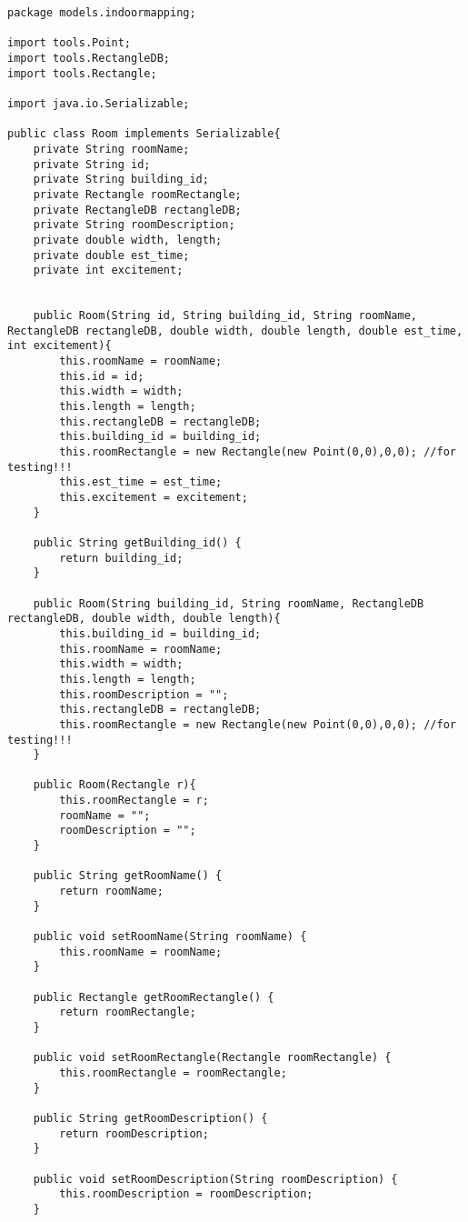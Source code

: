 \documentclass{article}
\begin{document}
\begin{lstlisting}package models.indoormapping;

import tools.Point;
import tools.RectangleDB;
import tools.Rectangle;

import java.io.Serializable;

public class Room implements Serializable{
    private String roomName;
    private String id;
    private String building_id;
    private Rectangle roomRectangle;
    private RectangleDB rectangleDB;
    private String roomDescription;
    private double width, length;
    private double est_time;
    private int excitement;


    public Room(String id, String building_id, String roomName, RectangleDB rectangleDB, double width, double length, double est_time, int excitement){
        this.roomName = roomName;
        this.id = id;
        this.width = width;
        this.length = length;
        this.rectangleDB = rectangleDB;
        this.building_id = building_id;
        this.roomRectangle = new Rectangle(new Point(0,0),0,0); //for testing!!!
        this.est_time = est_time;
        this.excitement = excitement;
    }

    public String getBuilding_id() {
        return building_id;
    }

    public Room(String building_id, String roomName, RectangleDB rectangleDB, double width, double length){
        this.building_id = building_id;
        this.roomName = roomName;
        this.width = width;
        this.length = length;
        this.roomDescription = "";
        this.rectangleDB = rectangleDB;
        this.roomRectangle = new Rectangle(new Point(0,0),0,0); //for testing!!!
    }

    public Room(Rectangle r){
        this.roomRectangle = r;
        roomName = "";
        roomDescription = "";
    }

    public String getRoomName() {
        return roomName;
    }

    public void setRoomName(String roomName) {
        this.roomName = roomName;
    }

    public Rectangle getRoomRectangle() {
        return roomRectangle;
    }

    public void setRoomRectangle(Rectangle roomRectangle) {
        this.roomRectangle = roomRectangle;
    }

    public String getRoomDescription() {
        return roomDescription;
    }

    public void setRoomDescription(String roomDescription) {
        this.roomDescription = roomDescription;
    }


\end{lstlisting}
\end{document}

